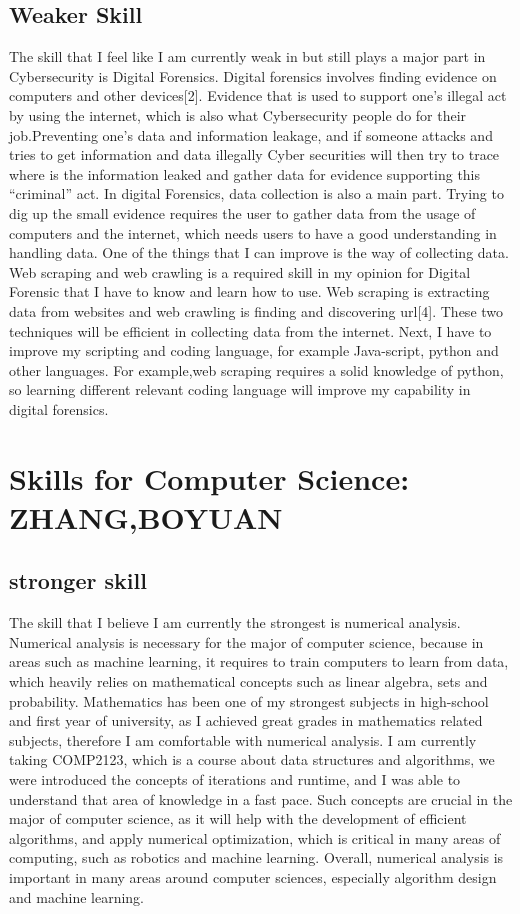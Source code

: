 \documentclass[a4paper, 11pt]{report}
\begin{document}
\subsection{Weaker Skill}
	The skill that I feel like I am currently weak in but still plays a major part in Cybersecurity is Digital Forensics. Digital forensics involves finding evidence on computers and other devices[2]. Evidence that is used to support one’s illegal act by using the internet, which is also what Cybersecurity people do for their job.Preventing one’s data and information leakage, and if someone attacks and tries to get information and data illegally Cyber securities will then try to trace where is the information leaked and gather data for evidence supporting this “criminal” act. In digital Forensics, data collection is also a main part. Trying to dig up the small evidence requires the user to gather data from the usage of computers and the internet, which needs users to have a good understanding in handling data. One of the things that I can improve is the way of collecting data. Web scraping and web crawling is a required skill in my opinion for Digital Forensic that I have to know and learn how to use. Web scraping is extracting data from websites and web crawling is finding and discovering url[4]. These two techniques will be efficient in collecting data from the internet. Next, I have to improve my scripting and coding language, for example Java-script, python and other languages. For example,web scraping requires a solid knowledge of python, so learning different relevant coding language will improve my capability in digital forensics.


\newpage
\section{Skills for Computer Science: ZHANG,BOYUAN}
\subsection{stronger skill}
	The skill that I believe I am currently the strongest is numerical analysis. 	Numerical analysis is necessary for the major of computer science, because in areas such as machine learning, it requires to train computers to learn from data, which heavily relies on mathematical concepts such as linear algebra, sets and probability. Mathematics has been one of my strongest subjects in high-school and first year of university, as I achieved great grades in mathematics related subjects, therefore I am comfortable with numerical analysis. I am currently taking COMP2123, which is a course about data structures and algorithms, we were introduced the concepts of iterations and runtime, and I was able to understand that area of knowledge in a fast pace. Such concepts are crucial in the major of  computer science, as it will help with the development of efficient algorithms, and apply numerical optimization, which is critical in many areas of computing, such as robotics and machine learning. Overall, numerical analysis is important in many areas around computer sciences, especially algorithm design and machine learning.
\end{document}
